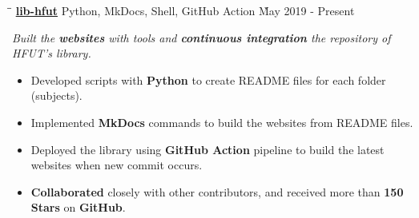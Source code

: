 \documentclass{res}
\begin{document}
\begin{resume}
    \vspace{-0.2in}	 
    \begin{tabbing}
    \hspace{2.391in}\= \hspace{3in}\= \kill %
    \href{https://github.com/lib-hfut/lib-hfut}{\bf lib-hfut}  \> 
                Python, MkDocs, Shell, GitHub Action \` May 2019 - Present \\
    \end{tabbing}\vspace{-20pt}      %
    \vspace{-0.13in}
    \textit{Built the {\bf websites} with tools and {\bf continuous integration} the repository of 
            HFUT's library.}
    \vspace{+0.05in}
    \begin{itemize} \itemsep 0.5pt %
        \item Developed scripts with {\bf Python} to create README files for each folder (subjects). 
        \item Implemented {\bf MkDocs} commands to build the websites from README files.
        \item Deployed the library using {\bf GitHub Action} pipeline to build the latest websites 
                when new commit occurs.
        \item {\bf Collaborated} closely with other contributors, and received more than 
                {\bf 150 Stars} on {\bf GitHub}.
    \end{itemize}

\end{resume}
\end{document}

